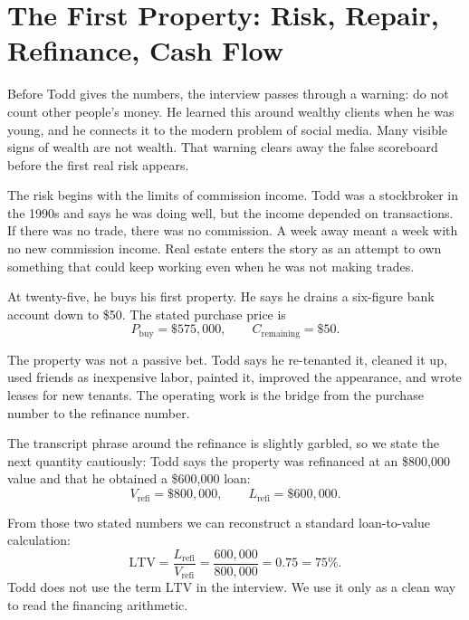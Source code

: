 \section{The First Property: Risk, Repair, Refinance, Cash Flow}

Before Todd gives the numbers, the interview passes through a warning: do not count other people's money. He learned this around wealthy clients when he was young, and he connects it to the modern problem of social media. Many visible signs of wealth are not wealth. That warning clears away the false scoreboard before the first real risk appears.

The risk begins with the limits of commission income. Todd was a stockbroker in the 1990s and says he was doing well, but the income depended on transactions. If there was no trade, there was no commission. A week away meant a week with no new commission income. Real estate enters the story as an attempt to own something that could keep working even when he was not making trades.

At twenty-five, he buys his first property. He says he drains a six-figure bank account down to \$50. The stated purchase price is
\begin{equation}
P_{\mathrm{buy}}=\$575{,}000,
\qquad
C_{\mathrm{remaining}}=\$50.
\end{equation}

The property was not a passive bet. Todd says he re-tenanted it, cleaned it up, used friends as inexpensive labor, painted it, improved the appearance, and wrote leases for new tenants. The operating work is the bridge from the purchase number to the refinance number.

The transcript phrase around the refinance is slightly garbled, so we state the next quantity cautiously: Todd says the property was refinanced at an \$800,000 value and that he obtained a \$600,000 loan:
\begin{equation}
V_{\mathrm{refi}}=\$800{,}000,
\qquad
L_{\mathrm{refi}}=\$600{,}000.
\end{equation}

From those two stated numbers we can reconstruct a standard loan-to-value calculation:
\begin{equation}
\mathrm{LTV}
=
\frac{L_{\mathrm{refi}}}{V_{\mathrm{refi}}}
=
\frac{600{,}000}{800{,}000}
=
0.75
=
75\%.
\end{equation}
Todd does not use the term \(\mathrm{LTV}\) in the interview. We use it only as a clean way to read the financing arithmetic.

